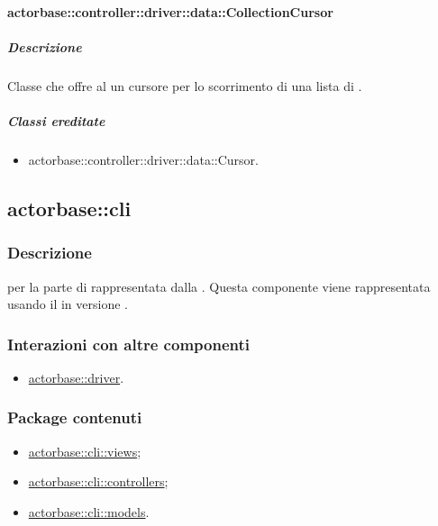 \documentclass{scalatekids-article}
\begin{document}
\paragraph{actorbase::controller::driver::data::CollectionCursor}

\subparagraph{Descrizione}

Classe che offre al  un cursore per lo scorrimento di una lista di
.

\subparagraph{Classi ereditate}

\begin{itemize}
\item actorbase::controller::driver::data::Cursor.
\end{itemize}


\subsection{actorbase::cli}
\label{sec:actorbase::cli}

\subsubsection{Descrizione}

 per la parte di  rappresentata dalla .
Questa componente viene rappresentata usando il 
 in versione .

\subsubsection{Interazioni con altre componenti}

\begin{itemize}
\item \hyperref[sec:actorbase::driver]{actorbase::driver}.
\end{itemize}

\subsubsection{Package contenuti}

\begin{itemize}
\item \hyperref[sec:actorbase::cli::views]{actorbase::cli::views};
\item \hyperref[sec:actorbase::cli::controllers]{actorbase::cli::controllers};
\item \hyperref[sec:actorbase::cli::models]{actorbase::cli::models}.
\end{itemize}
\end{document}
